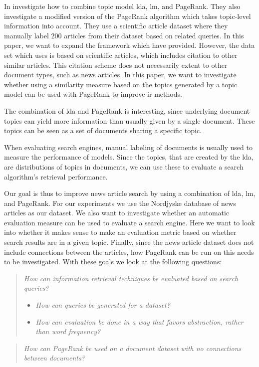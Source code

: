 In \cite{yang2009topic} \citeauthor{yang2009topic} investigate how to combine topic model \gls{lda}, \gls{lm}, and PageRank.
They also investigate a modified version of the PageRank algorithm which takes topic-level information into account.
They use a scientific article dataset where they manually label 200 articles from their dataset based on related queries. 
In this paper, we want to expand the framework which \cite{yang2009topic} have provided.
However, the data set which \cite{yang2009topic} uses is based on scientific articles, which includes citation to other similar articles.
This citation scheme does not necessarily extent to other document types, such as news articles.
In this paper, we want to investigate whether using a similarity measure based on the topics generated by a topic model can be used with PageRank to improve \gls{ir} methods.

The combination of \gls{lda} and PageRank is interesting, since underlying document topics can yield more information than usually given by a single document.
These topics can be seen as a set of documents sharing a specific topic. 

When evaluating search engines, manual labeling of documents is usually used to measure the performance of models\cite{yang2009topic}\cite{Tang2008}.
Since the topics, that are created by the \gls{lda}, are distributions of topics in documents, we can use these to evaluate a search algorithm's retrieval performance. 

Our goal is thus to improve news article search by using a combination of \gls{lda}, \gls{lm}, and PageRank.
For our experiments we use the Nordjyske database of news articles as our dataset.
We also want to investigate whether an automatic evaluation measure can be used to evaluate a search engine.
Here we want to look into whether it makes sense to make an evaluation metric based on whether search results are in a given topic.
Finally, since the news article dataset does not include connections between the articles, how PageRank can be run on this needs to be investigated.
With these goals we look at the following questions:

\begin{quote}
	\emph{How can information retrieval techniques be evaluated based on search queries?}
	\begin{itemize}
		\item \emph{How can queries be generated for a dataset?}
		\item \emph{How can evaluation be done in a way that favors abstraction, rather than word frequency?}
	\end{itemize}
\end{quote}
\vspace{0.1 cm}

\begin{quote}
	\emph{How can PageRank be used on a document dataset with no connections between documents?}
\end{quote}




